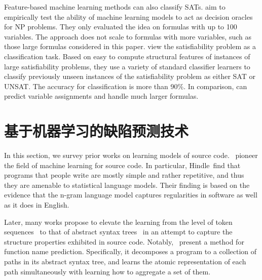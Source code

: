 Feature-based machine learning methods
\citet{devlin2008satisfiability, grozea2014can} can also classify
SATs. \citet{grozea2014can} aim to empirically test the ability of
machine learning models to act as decision oracles for NP problems.
They only evaluated the idea on formulas with up to 100 variables.
The approach does not scale to formulas with more variables, such as
those large formulas considered in this
paper. \citet{devlin2008satisfiability} view the satisfiability
problem as a classification task.  Based on easy to compute structural
features of instances of large satisfiability problems, they use a
variety of standard classifier learners to classify previously unseen
instances of the satisfiability problem as either SAT or UNSAT.  The
accuracy for classification is more than 90\%.  In comparison, \tool
can predict variable assignments and handle much larger formulas.

\section{基于机器学习的缺陷预测技术} \label{sec:related:ml}
In this section, we survey prior works on learning models of source code.~\citet{Hindle10} pioneer the field of machine learning for source code. In particular, Hindle~\etal find that programs that people write are mostly simple and rather repetitive, and thus they are amenable to statistical language models. Their finding is based on the evidence that the n-gram language model captures regularities in software as well as it does in English.


Later, many works propose to elevate the learning from the level of token sequences~\cite{Hindle10,Pu2016,AAAI1714603,Nguyen1145} to that of abstract syntax trees~\cite{maddison2014structured,Alon:2019:CLD:3302515.3290353,alon2018code2seq} in an attempt to capture the structure properties exhibited in source code. Notably,~\citet{Alon:2019:CLD:3302515.3290353} present a method for function name prediction. Specifically, it decomposes a program to a collection of paths in its abstract syntax tree, and learns the atomic representation of each path simultaneously with learning how to aggregate a set of them.


